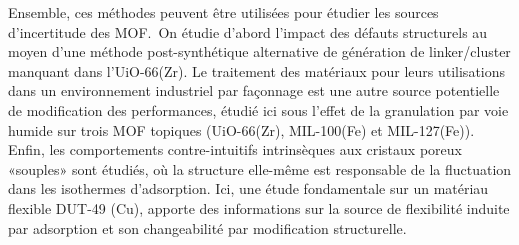 \begin{minipage}{\textwidth}
{Ensemble, ces méthodes peuvent être utilisées pour étudier les sources 
d'incertitude des MOF.\ On étudie d’abord l’impact des défauts
structurels au moyen d’une méthode post-synthétique alternative de
génération de linker/cluster manquant dans l'UiO-66(Zr). 
Le traitement des matériaux pour leurs utilisations dans 
un environnement industriel par façonnage est une autre source
potentielle de modification des performances, étudié ici sous l’effet
de la granulation par voie humide sur trois MOF topiques (UiO-66(Zr),
MIL-100(Fe) et MIL-127(Fe)). 
Enfin, les comportements contre-intuitifs intrinsèques aux cristaux poreux 
«souples» sont étudiés, où la structure elle-même est responsable de la 
fluctuation dans les isothermes d'adsorption. Ici, une étude 
fondamentale sur un matériau flexible DUT-49 (Cu), apporte 
des informations sur la source de
flexibilité induite par adsorption et son changeabilité 
par modification structurelle.

}

\end{minipage}

\restoregeometry
